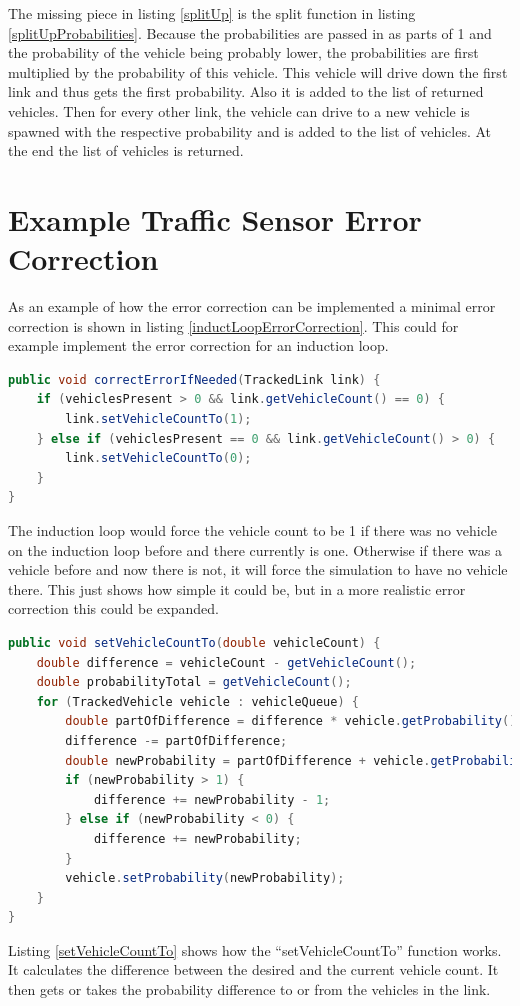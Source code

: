 The missing piece in listing \ref{splitUp} is the split function in listing \ref{splitUpProbabilities}. Because the probabilities are passed in as parts of 1 and the probability of the vehicle being probably lower, the probabilities are first multiplied by the probability of this vehicle. This vehicle will drive down the first link and thus gets the first probability. Also it is added to the list of returned vehicles. Then for every other link, the vehicle can drive to a new vehicle is spawned with the respective probability and is added to the list of vehicles. At the end the list of vehicles is returned.

\section{Example Traffic Sensor Error Correction}

As an example of how the error correction can be implemented a minimal error correction is shown in listing \ref{inductLoopErrorCorrection}. This could for example implement the error correction for an induction loop.

\vspace{0.5em}

\begin{lstlisting}[caption={Induction Loop Error Correction}, label=inductLoopErrorCorrection, language=Java]
public void correctErrorIfNeeded(TrackedLink link) {
	if (vehiclesPresent > 0 && link.getVehicleCount() == 0) {
		link.setVehicleCountTo(1);
	} else if (vehiclesPresent == 0 && link.getVehicleCount() > 0) {
		link.setVehicleCountTo(0);
	}
}
\end{lstlisting}

The induction loop would force the vehicle count to be 1 if there was no vehicle on the induction loop before and there currently is one. Otherwise if there was a vehicle before and now there is not, it will force the simulation to have no vehicle there. This just shows how simple it could be, but in a more realistic error correction this could be expanded.

\vspace{0.5em}

\begin{lstlisting}[caption={Set Vehicle Count Function of TrackedLink}, label=setVehicleCountTo, language=Java]
public void setVehicleCountTo(double vehicleCount) {
	double difference = vehicleCount - getVehicleCount();
	double probabilityTotal = getVehicleCount();
	for (TrackedVehicle vehicle : vehicleQueue) {
		double partOfDifference = difference * vehicle.getProbability() / probabilityTotal;
		difference -= partOfDifference;
		double newProbability = partOfDifference + vehicle.getProbability();
		if (newProbability > 1) {
			difference += newProbability - 1;
		} else if (newProbability < 0) {
			difference += newProbability;
		}
		vehicle.setProbability(newProbability);
	}
}
\end{lstlisting}

Listing \ref{setVehicleCountTo} shows how the ``setVehicleCountTo'' function works. It calculates the difference between the desired and the current vehicle count. It then gets or takes the probability difference to or from the vehicles in the link.